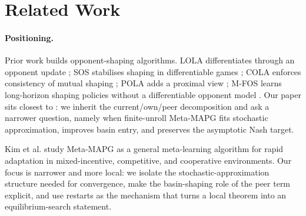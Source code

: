 \documentclass{nextgame2026} %
\begin{document}
\section{Related Work}\label{sec:related}

\paragraph{Positioning.}
Prior work builds opponent-shaping algorithms. LOLA differentiates through an opponent update \citep{foerster2018lola}; SOS stabilises shaping in differentiable games \citep{letcher2019stable}; COLA enforces consistency of mutual shaping \citep{willi2022cola}; POLA adds a proximal view \citep{zhao2022pola}; M-FOS learns long-horizon shaping policies without a differentiable opponent model \citep{lu2022mfos}. Our paper sits closest to \citet{kim2021meta}: we inherit the current/own/peer decomposition and ask a narrower question, namely when finite-unroll Meta-MAPG fits stochastic approximation, improves basin entry, and preserves the asymptotic Nash target.

\begin{table}[t]
  \centering
  \caption{Positioning among opponent-aware methods. ``Nash-preserving'' means the stated theory preserves the original game's stable Nash target rather than merely optimising a shaped meta-objective.}
  \label{tab:related}
\end{table}

Kim et al. study Meta-MAPG as a general meta-learning algorithm for rapid adaptation in mixed-incentive, competitive, and cooperative environments. Our focus is narrower and more local: we isolate the stochastic-approximation structure needed for convergence, make the basin-shaping role of the peer term explicit, and use restarts as the mechanism that turns a local theorem into an equilibrium-search statement.
\end{document}
